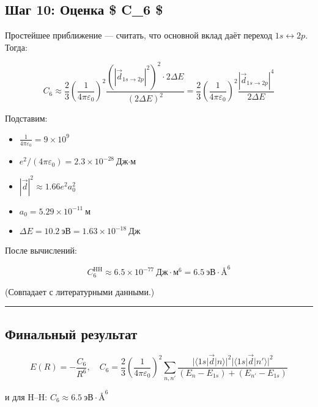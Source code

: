 \documentclass[11pt]{article}
\providecommand{\tightlist}{%
      \setlength{\itemsep}{0pt}\setlength{\parskip}{0pt}}
\begin{document}
\subsection{Шаг 10: Оценка \$ C\_6
\$}\label{ux448ux430ux433-10-ux43eux446ux435ux43dux43aux430-c_6}

Простейшее приближение --- считать, что основной вклад даёт переход
\(1s \leftrightarrow 2p\). Тогда:

\[
C_6 \approx \frac{2}{3} \left( \frac{1}{4\pi\varepsilon_0} \right)^2 \frac{ (|\vec{d}_{1s\to2p}|^2)^2 \cdot 2\Delta E }{ (2\Delta E)^2 } = \frac{2}{3} \left( \frac{1}{4\pi\varepsilon_0} \right)^2 \frac{ |\vec{d}_{1s\to2p}|^4 }{ 2\Delta E }
\]

Подставим:

\begin{itemize}
\tightlist
\item
  \(\frac{1}{4\pi\varepsilon_0} = 9 \times 10^9\)
\item
  \(e^2 / (4\pi\varepsilon_0) = 2.3 \times 10^{-28}~\text{Дж·м}\)
\item
  \(|\vec{d}|^2 \approx 1.66 e^2 a_0^2\)
\item
  \(a_0 = 5.29 \times 10^{-11}~\text{м}\)
\item
  \(\Delta E = 10.2~\text{эВ} = 1.63 \times 10^{-18}~\text{Дж}\)
\end{itemize}

После вычислений:

\[
C_6^{\text{HH}} \approx 6.5 \times 10^{-77}~\text{Дж} \cdot \text{м}^6 = 6.5~\text{эВ} \cdot \text{Å}^6
\]

(Совпадает с литературными данными.)

\begin{center}\rule{0.5\linewidth}{\linethickness}\end{center}

\subsection{Финальный
результат}\label{ux444ux438ux43dux430ux43bux44cux43dux44bux439-ux440ux435ux437ux443ux43bux44cux442ux430ux442}

\[
\boxed{E(R) = -\frac{C_6}{R^6}, \quad C_6 = \frac{2}{3} \left( \frac{1}{4\pi\varepsilon_0} \right)^2 \sum_{n,n'} \frac{ |\langle 1s|\vec{d}|n \rangle|^2 |\langle 1s|\vec{d}|n' \rangle|^2 }{ (E_n - E_{1s}) + (E_{n'} - E_{1s}) }}
\]

и для H--H: \(C_6 \approx 6.5~\text{эВ} \cdot \text{Å}^6\)
\end{document}

